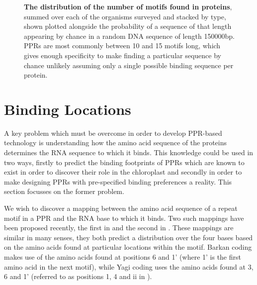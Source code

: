 \begin{figure}
\begin{center}
    \caption{
      \textbf{The distribution of the number of motifs found in proteins}, 
      summed over each of the organisms surveyed and stacked by type, shown
      plotted alongside the probability of a sequence of that length appearing
      by chance in a random DNA sequence of length 150000bp.
      PPRs are most commonly between 10 and 15 motifs long, which gives enough
      specificity to make finding a particular sequence by chance unlikely
      assuming only a single possible binding sequence per protein.
      \label{fig:ppr_family_lengths}}
  \end{center}
\end{figure}

\section{Binding Locations}

A key problem which must be overcome in order to develop PPR-based technology
is understanding how the amino acid sequence of the proteins determines the RNA
sequence to which it binds.
This knowledge could be used in two ways, firstly to predict the binding
footprints of PPRs which are known to exist in order to discover their role in
the chloroplast and secondly in order to make designing PPRs with pre-specified
binding preferences a reality.
This section focusses on the former problem.

We wish to discover a mapping between the amino acid sequence of a repeat
motif in a PPR and the RNA base to which it binds.
Two such mappings have been proposed recently, the first in \citet{Barkan2012}
and the second in \citet{Yagi2013}.
These mappings are similar in many senses, they both predict a distribution
over the four bases based on the amino acids found at particular locations
within the motif.
Barkan coding makes use of the amino acids found at positions 6 and 1' (where
1' is the first amino acid in the next motif), while Yagi coding uses the amino
acids found at 3, 6 and 1' (referred to as positions 1, 4 and ii in 
\citet{Yagi2013}).


